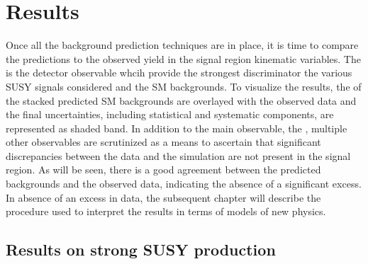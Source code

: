 \chapter{Results}\label{sec:results}
Once all the background prediction techniques are in place, it is time to compare the predictions to the observed yield in the signal region kinematic variables. 
The \ptmiss is the detector observable whcih provide the strongest discriminator the various SUSY signals considered and the SM backgrounds. 
To visualize the results, the \ptmiss of the stacked predicted SM backgrounds are overlayed with the observed data and the final uncertainties, including statistical and systematic components, are represented as shaded band. 
In addition to the main observable, the \ptmiss, multiple other observables are scrutinized as a means to ascertain that significant discrepancies between the data and the simulation are not present in the signal region.
As will be seen, there is a good agreement between the predicted backgrounds and the observed data, indicating the absence of a significant excess. 
In absence of an excess in data, the subsequent chapter will describe the procedure used to interpret the results in terms of models of new physics. 
\section{Results on strong SUSY production}
